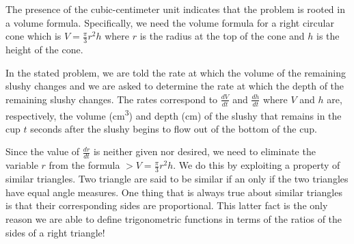\documentclass[10pt,oneside,]{book}
\theoremstyle{plain}
\theoremstyle{definition}
\numberwithin{equation}{section}
\newcounter{figstack}
\newlength\fight
\newcommand\pushValignCaptionBottom[5][b]{%
\stepcounter{figstack}%
\expandafter\def\csname %
figalign\romannumeral\value{figstack}\endcsname{#1}%
\expandafter\def\csname %
figtype\romannumeral\value{figstack}\endcsname{#2}%
\expandafter\def\csname %
figwd\romannumeral\value{figstack}\endcsname{#3}%
\expandafter\def\csname %
figcontent\romannumeral\value{figstack}\endcsname{#4}%
\expandafter\def\csname %
figcap\romannumeral\value{figstack}\endcsname{#5}%
\setbox0=\hbox{%
\begin{#2}{#3}#4\end{#2}}%
\ifdim\dimexpr\ht0+\dp0\relax>\fight\global\setlength{\fight}{%
\dimexpr\ht0+\dp0\relax}\fi%
}
\newcommand{\lz}[2]{\frac{d#1}{d#2}}
\begin{document}
\begin{exerciselist}
\par
The presence of the cubic-centimeter unit indicates that the problem is rooted in a volume formula. Specifically, we need the volume formula for a right circular cone which is \(V=\frac{\pi}{3}r^2h\) where \(r\) is the radius at the top of the cone and \(h\) is the height of the cone.%
\par
In the stated problem, we are told the rate at which the volume of the remaining slushy changes and we are asked to determine the rate at which the depth of the remaining slushy changes. The rates correspond to \(\lz{V}{t}\) and \(\lz{h}{t}\) where \(V\) and \(h\) are, respectively, the volume (\si{\centi\meter\tothe{3}}) and depth (\si{\centi\meter}) of the slushy that remains in the cup \(t\) seconds after the slushy begins to flow out of the bottom of the cup.%
\par
Since the value of \(\lz{r}{t}\) is neither given nor desired, we need to eliminate the variable \(r\) from the formula \(>V=\frac{\pi}{3}r^2h\). We do this by exploiting a property of similar triangles. Two triangle are said to be similar if an only if the two triangles have equal angle measures. One thing that is always true about similar triangles is that their corresponding sides are proportional. This latter fact is the only reason we are able to define trigonometric functions in terms of the ratios of the sides of a right triangle!%
\end{exerciselist}
\end{document}
